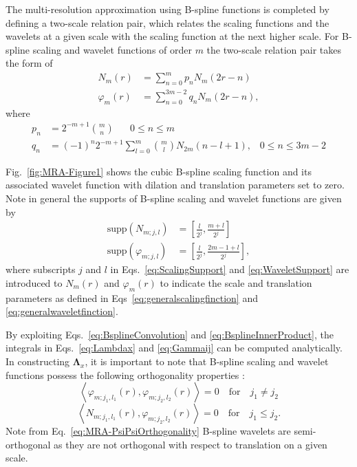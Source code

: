 \documentclass[review,authoryear,3p]{elsarticle}
\begin{document}
The multi-resolution approximation using B-spline functions is completed by defining a two-scale relation pair, which relates the scaling functions and the wavelets at a given scale with the scaling function at the next higher scale. For B-spline scaling and wavelet functions of order $m$ the two-scale relation pair takes the form of \citep{Chui1992}
\begin{align}
 N_{m}\left(r\right)&=\sum_{n=0}^{m}  p_n N_{m}\left(2r-n\right) \label{eq:MRA-TwoScalepair1} \\
  \varphi_{m}\left(r\right) &= \sum_{n=0}^{3m-2} q_n N_{m}\left(2r-n\right)\label{eq:MRA-TwoScalepair2},
 \end{align}
where 
 \begin{align}
 p_n&=2^{-m+1} \binom{m}{n} \quad \text{ $0\le n\le m$} \label{eq:MRA-TwoScalepair1coefs}\\
q_n&= \left(-1\right)^n{2^{-m+1}}\sum_{l=0}^{m} \binom{m}{l} N_{2m}\left(n-l+1\right), \,  \text{ $0\le n\le 3m-2$}\label{eq:MRA-TwoScalepair2coefs}
 \end{align}

Fig.~\ref{fig:MRA-Figure1} shows the cubic B-spline scaling function and its associated wavelet function with dilation and translation parameters set to zero. Note in general the supports of B-spline scaling and wavelet functions are given by 
\begin{align}
	\mathrm{supp}(N_{m;j,l})&=\left[\frac{l}{2^j},\frac{m+l}{2^j}\right] \label{eq:ScalingSupport}\\  
  \mathrm{supp}(\varphi_{m;j,l})&=\left[\frac{l}{2^j},\frac{2m-1+l}{2^j}\right],\label{eq:WaveletSupport}
	\end{align}    
where subscripts $j$ and $l$ in Eqs.~\eqref{eq:ScalingSupport} and \eqref{eq:WaveletSupport} are introduced to $N_{m}(r)$ and $\varphi_{m}(r)$ to indicate the scale and translation parameters as defined in Eqs~\eqref{eq:generalscalingfinction} and \eqref{eq:generalwaveletfinction}.

 
By exploiting Eqs.~\eqref{eq:BsplineConvolution} and \eqref{eq:BsplineInnerProduct}, the integrals in Eqs.~\eqref{eq:Lambdax} and \eqref{eq:Gammaij} can be computed analytically. In constructing $\boldsymbol\Lambda_{x}$, it is important to note that B-spline scaling and wavelet functions possess the following orthogonality properties \citep{Unser1993}: 
\begin{equation}
  \left\langle \varphi_{m;j_1,l_1}(r),\varphi_{m;j_2,l_2}(r)\right\rangle =0  \quad \mathrm{for} \quad j_1\neq j_2
 \label{eq:MRA-PsiPsiOrthogonality} 
 \end{equation}
 \begin{equation}
  \left\langle N_{m;j_1,l_1}(r),\varphi_{m;j_2,l_2}(r)\right\rangle =0  \quad \mathrm{for} \quad j_1\leq j_2.
 \label{eq:MRA-PhiPsiOrthogonality}
 \end{equation}
Note from Eq.~\eqref{eq:MRA-PsiPsiOrthogonality} B-spline wavelets are semi-orthogonal as they are not orthogonal with respect to translation on a given scale.
\end{document}
